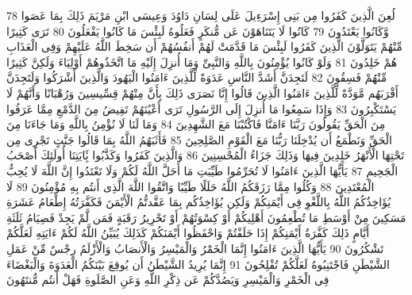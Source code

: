 {\tiny\colorbox{cl_aya}{78}} لُعِنَ الَّذِينَ كَفَرُوا مِن بَنِى إِسْرَءِيلَ عَلَى لِسَانِ دَاوُدَ وَعِيسَى ابْنِ مَرْيَمَ ذَلِكَ بِمَا عَصَوا وَّكَانُوا يَعْتَدُونَ
{\tiny\colorbox{cl_aya}{79}} كَانُوا لَا يَتَنَاهَوْنَ عَن مُّنكَرٍ فَعَلُوهُ لَبِئْسَ مَا كَانُوا يَفْعَلُونَ
{\tiny\colorbox{cl_aya}{80}} تَرَى كَثِيرًا مِّنْهُمْ يَتَوَلَّوْنَ الَّذِينَ كَفَرُوا لَبِئْسَ مَا قَدَّمَتْ لَهُمْ أَنفُسُهُمْ أَن سَخِطَ اللَّهُ عَلَيْهِمْ وَفِى الْعَذَابِ هُمْ خَلِدُونَ
{\tiny\colorbox{cl_aya}{81}} وَلَوْ كَانُوا يُؤْمِنُونَ بِاللَّهِ وَالنَّبِىِّ وَمَا أُنزِلَ إِلَيْهِ مَا اتَّخَذُوهُمْ أَوْلِيَاءَ وَلَكِنَّ كَثِيرًا مِّنْهُمْ فَسِقُونَ
{\tiny\colorbox{cl_aya}{82}} لَتَجِدَنَّ أَشَدَّ النَّاسِ عَدَوَةً لِّلَّذِينَ ءَامَنُوا الْيَهُودَ وَالَّذِينَ أَشْرَكُوا وَلَتَجِدَنَّ أَقْرَبَهُم مَّوَدَّةً لِّلَّذِينَ ءَامَنُوا الَّذِينَ قَالُوا إِنَّا نَصَرَى ذَلِكَ بِأَنَّ مِنْهُمْ قِسِّيسِينَ وَرُهْبَانًا وَأَنَّهُمْ لَا يَسْتَكْبِرُونَ
{\tiny\colorbox{cl_aya}{83}} وَإِذَا سَمِعُوا مَا أُنزِلَ إِلَى الرَّسُولِ تَرَى أَعْيُنَهُمْ تَفِيضُ مِنَ الدَّمْعِ مِمَّا عَرَفُوا مِنَ الْحَقِّ يَقُولُونَ رَبَّنَا ءَامَنَّا فَاكْتُبْنَا مَعَ الشَّهِدِينَ
{\tiny\colorbox{cl_aya}{84}} وَمَا لَنَا لَا نُؤْمِنُ بِاللَّهِ وَمَا جَاءَنَا مِنَ الْحَقِّ وَنَطْمَعُ أَن يُدْخِلَنَا رَبُّنَا مَعَ الْقَوْمِ الصَّلِحِينَ
{\tiny\colorbox{cl_aya}{85}} فَأَثَبَهُمُ اللَّهُ بِمَا قَالُوا جَنَّتٍ تَجْرِى مِن تَحْتِهَا الْأَنْهَرُ خَلِدِينَ فِيهَا وَذَلِكَ جَزَاءُ الْمُحْسِنِينَ
{\tiny\colorbox{cl_aya}{86}} وَالَّذِينَ كَفَرُوا وَكَذَّبُوا بَِٔايَتِنَا أُولَئِكَ أَصْحَبُ الْجَحِيمِ
{\tiny\colorbox{cl_aya}{87}} يَأَيُّهَا الَّذِينَ ءَامَنُوا لَا تُحَرِّمُوا طَيِّبَتِ مَا أَحَلَّ اللَّهُ لَكُمْ وَلَا تَعْتَدُوا إِنَّ اللَّهَ لَا يُحِبُّ الْمُعْتَدِينَ
{\tiny\colorbox{cl_aya}{88}} وَكُلُوا مِمَّا رَزَقَكُمُ اللَّهُ حَلَلًا طَيِّبًا وَاتَّقُوا اللَّهَ الَّذِى أَنتُم بِهِ مُؤْمِنُونَ
{\tiny\colorbox{cl_aya}{89}} لَا يُؤَاخِذُكُمُ اللَّهُ بِاللَّغْوِ فِى أَيْمَنِكُمْ وَلَكِن يُؤَاخِذُكُم بِمَا عَقَّدتُّمُ الْأَيْمَنَ فَكَفَّرَتُهُ إِطْعَامُ عَشَرَةِ مَسَكِينَ مِنْ أَوْسَطِ مَا تُطْعِمُونَ أَهْلِيكُمْ أَوْ كِسْوَتُهُمْ أَوْ تَحْرِيرُ رَقَبَةٍ فَمَن لَّمْ يَجِدْ فَصِيَامُ ثَلَثَةِ أَيَّامٍ ذَلِكَ كَفَّرَةُ أَيْمَنِكُمْ إِذَا حَلَفْتُمْ وَاحْفَظُوا أَيْمَنَكُمْ كَذَلِكَ يُبَيِّنُ اللَّهُ لَكُمْ ءَايَتِهِ لَعَلَّكُمْ تَشْكُرُونَ
{\tiny\colorbox{cl_aya}{90}} يَأَيُّهَا الَّذِينَ ءَامَنُوا إِنَّمَا الْخَمْرُ وَالْمَيْسِرُ وَالْأَنصَابُ وَالْأَزْلَمُ رِجْسٌ مِّنْ عَمَلِ الشَّيْطَنِ فَاجْتَنِبُوهُ لَعَلَّكُمْ تُفْلِحُونَ
{\tiny\colorbox{cl_aya}{91}} إِنَّمَا يُرِيدُ الشَّيْطَنُ أَن يُوقِعَ بَيْنَكُمُ الْعَدَوَةَ وَالْبَغْضَاءَ فِى الْخَمْرِ وَالْمَيْسِرِ وَيَصُدَّكُمْ عَن ذِكْرِ اللَّهِ وَعَنِ الصَّلَوةِ فَهَلْ أَنتُم مُّنتَهُونَ
